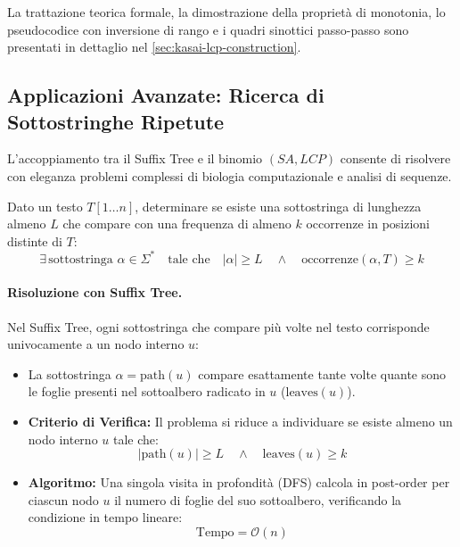 La trattazione teorica formale, la dimostrazione della propriet\`a di monotonia, lo pseudocodice con inversione di rango e i quadri sinottici passo-passo sono presentati in dettaglio nel \autoref{sec:kasai-lcp-construction}.

\FloatBarrier
\subsection{Applicazioni Avanzate: Ricerca di Sottostringhe Ripetute}
\label{subsec:applicazioni-lcp-ripetute}

L'accoppiamento tra il Suffix Tree e il binomio $(SA, LCP)$ consente di risolvere con eleganza problemi complessi di biologia computazionale e analisi di sequenze.

\begin{example}
Dato un testo $T[1 \dots n]$, determinare se esiste una sottostringa di lunghezza almeno $L$ che compare con una frequenza di almeno $k$ occorrenze in posizioni distinte di $T$:
\begin{equation}
  \exists \, \text{sottostringa } \alpha \in \Sigma^* \quad \text{tale che} \quad |\alpha| \ge L \quad \land \quad \text{occorrenze}(\alpha, T) \ge k
\end{equation}
\end{example}

\paragraph{Risoluzione con Suffix Tree.}
Nel Suffix Tree, ogni sottostringa che compare pi\`u volte nel testo corrisponde univocamente a un nodo interno $u$:
\begin{itemize}
  \item La sottostringa $\alpha = \text{path}(u)$ compare esattamente tante volte quante sono le foglie presenti nel sottoalbero radicato in $u$ ($\text{leaves}(u)$).
  \item \textbf{Criterio di Verifica:} Il problema si riduce a individuare se esiste almeno un nodo interno $u$ tale che:
  \begin{equation}
    |\text{path}(u)| \ge L \quad \land \quad \text{leaves}(u) \ge k
  \end{equation}
  \item \textbf{Algoritmo:} Una singola visita in profondit\`a (DFS) calcola in post-order per ciascun nodo $u$ il numero di foglie del suo sottoalbero, verificando la condizione in tempo lineare:
  \begin{equation}
    \text{Tempo} = \mathcal{O}(n)
  \end{equation}
\end{itemize}

